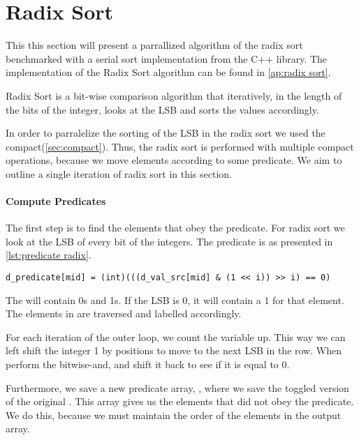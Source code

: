 \section{Radix Sort}
\label{sec:radix sort}

This this section will present a parrallized algorithm of the radix sort benchmarked with a serial sort implementation from the C++ library.
The implementation of the Radix Sort algorithm can be found in \cref{ap:radix sort}.

Radix Sort is a bit-wise comparison algorithm that iteratively, in the length of the bits of the integer, looks at the LSB and sorts the values accordingly.\cite{udacity}

In order to parralelize the sorting of the LSB in the radix sort we used the compact(\cref{sec:compact}).  
Thus, the radix sort is performed with multiple compact operations, because we move elements according to some predicate.
We aim to outline a single iteration of radix sort in this section.


\paragraph{Compute Predicates}
The first step is to find the elements that obey the predicate.
For radix sort we look at the LSB of every bit of the integers.
The predicate is as presented in \cref{lst:predicate radix}.

\begin{lstlisting}[caption={predicate to calculate}, label={lst:predicate radix}]
d_predicate[mid] = (int)(((d_val_src[mid] & (1 << i)) >> i) == 0)
\end{lstlisting}

The  will contain 0s and 1s.
If the LSB is 0, it will contain a 1 for that element.
The elements in  are traversed and labelled accordingly.

For each iteration of the outer loop, we count the  variable up.
This way we can left shift the integer 1 by  positions to move to the next LSB in the row.
When perform the bitwise-and, and shift it back to see if it is equal to 0.

Furthermore, we save a new predicate array, , where we save the toggled version of the original .
This array gives us the elements that did not obey the predicate.
We do this, because we must maintain the order of the elements in the output array.

